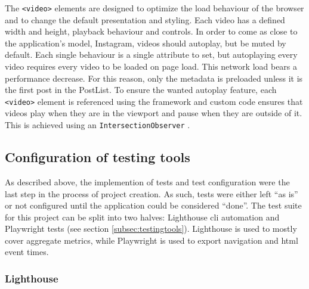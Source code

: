 \documentclass[a4paper, 12pt]{article}
\begin{document}
The \verb|<video>| elements are designed to optimize the load behaviour of the browser and to change the default presentation and styling.
Each video has a defined width and height, playback behaviour and controls.
In order to come as close to the application's model, Instagram, videos should autoplay, but be muted by default.
Each single behaviour is a single attribute to set, but autoplaying every video requires every video to be loaded on page load.
This network load bears a performance decrease.
For this reason, only the metadata is preloaded unless it is the first post in the PostList.
To ensure the wanted autoplay feature, each \verb|<video>| element is referenced using the framework and custom code ensures that videos play when they are in the viewport and pause when they are outside of it.
This is achieved using an \verb|IntersectionObserver| \citep{IntersectionObserver}.

\subsection{Configuration of testing tools}\label{subsec:tests}
% 

As described above, the implemention of tests and test configuration were the last step in the process of project creation.
As such, tests were either left \enquote{as is} or not configured until the application could be considered \enquote{done}.
The test suite for this project can be split into two halves: Lighthouse \acrshort{cli} automation and Playwright tests (see section \ref{subsec:testingtools}).
Lighthouse is used to mostly cover aggregate metrics, while Playwright is used to export navigation and \acrshort{html} event times.

\subsubsection{Lighthouse}
\end{document}
